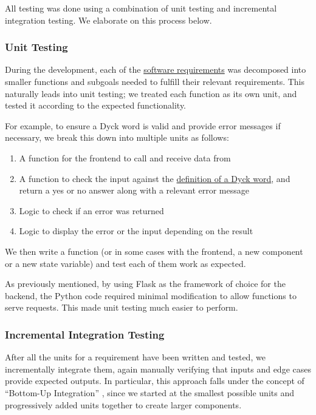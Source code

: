 All testing was done using a combination of unit testing and incremental integration testing. We elaborate on this process below.

\subsubsection{Unit Testing}
During the development, each of the \hyperref[softwareReqs]{software requirements} was decomposed into smaller functions and subgoals needed to fulfill their relevant requirements. This naturally leads into unit testing; we treated each function as its own unit, and tested it according to the expected functionality. 

For example, to ensure a Dyck word is valid and provide error messages if necessary, we break this down into multiple units as follows:
\begin{enumerate}
    \item A function for the frontend to call and receive data from
    \item A function to check the input against the \hyperref[def:seqDyck]{definition of a Dyck word}, and return a yes or no answer along with a relevant error message
    \item Logic to check if an error was returned
    \item Logic to display the error or the input depending on the result
\end{enumerate}

We then write a function (or in some cases with the frontend, a new component or a new state variable) and test each of them work as expected. 

As previously mentioned, by using Flask as the framework of choice for the backend, the Python code required minimal modification to allow functions to serve requests. This made unit testing much easier to perform. 

\subsubsection{Incremental Integration Testing}
After all the units for a requirement have been written and tested, we incrementally integrate them, again manually verifying that inputs and edge cases provide expected outputs. In particular, this approach falls under the concept of ``Bottom-Up Integration'' \cite{bottomupint}, since we started at the smallest possible units and progressively added units together to create larger components.
